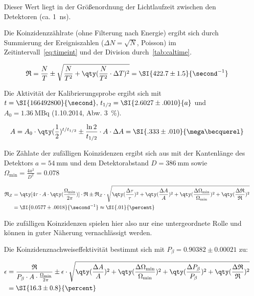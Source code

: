 \documentclass[slug=PET, room=Andreas-Schubert-Bau\,\ 424A, supervisor=Carsten\ Bittrich, coursedate=10.\ 01.\ 2020]{../../Lab_Report_LaTeX/lab_report}
\begin{document}
Dieser Wert liegt in der Gr\"o\ss{}enordnung der Lichtlaufzeit
zwischen den Detektoren (ca. \SI{1}{\nano\second}).

Die Koinzidenzz\"ahlrate (ohne Filterung nach Energie) ergibt sich
durch Summierung der Ereigniszahlen (\(\Delta N = \sqrt{N}\),
Poisson) im Zeitintervall~\eqref{eq:timeint} und der Division
durch~\eqref{tab:caltime}.

\begin{equation}
  \label{eq:ctrate}
  \mathfrak{R} = \frac{N}{T} \pm \sqrt{\frac{N}{T^2} +
    \qty(\frac{N}{T^2}\cdot \Delta T)^2} = \SI{422.7\pm 1.5}{\second^{-1}}
\end{equation}

Die Aktivität der  Kalibrierungsprobe ergibt sich mit
\(t=\SI{166492800}{\second},\, t_{1/2} = \SI{2.6027\pm .0010}{a}\) und \(A_0
= \SI{1.36}{\mega\becquerel}\) (1.10.2014, Abw. \SI{3}{\percent}).

\begin{equation}
  \label{eq:acttoday}
  A = A_0\cdot \qty(\frac{1}{2})^{t/t_{1/2}} \pm
  \frac{\ln{2}}{t_{1/2}}\cdot A\cdot\Delta A = \SI{.333\pm.010}{\mega\becquerel}
\end{equation}

Die Z\"ahlate der zuf\"alligen Koinzidenzen ergibt sich aus
mit der Kantenl\"ange des Detektors
\(a=\SI{54}{\milli\meter}\) und dem Detektorabstand
\(D=\SI{386}{\milli\meter}\) sowie
\(\Omega_{\min} = \frac{4a^2}{D^2} = 0.078\)

\begin{align}
  \label{eq:incidentalrate}
  \mathfrak{R}_Z &= \qty[4\tau\cdot A\cdot
  \qty(\frac{\Omega_{\min}}{2\pi})]\cdot \mathfrak{R} \pm \mathfrak{R}_Z\cdot
  \sqrt{\qty(\frac{\Delta\tau}{\tau})^2 + \qty(\frac{\Delta A}{A})^2 +
    \qty(\frac{\Delta\Omega_{\min}}{\Omega_{\min}})^2 +
                   \qty(\frac{\Delta\mathfrak{R}}{\mathfrak{R}})^2} \\
                 &= \SI{0.0577\pm .0018}{\second^{-1}} \approx \SI{.01}{\percent}
\end{align}

Die zuf\"alligen Koinzidenzen spielen hier also nur eine
untergeordnete Rolle und k\"onnen in guter N\"aherung vernachl\"assigt
werden.

Die Koinzidenznachweiseffektivit\"at bestimmt sich
mit \(P_\beta = 0.90382\pm 0.00021\) zu:

\begin{align}
  \epsilon & = \frac{\mathfrak{R}}{P_\beta\cdot A \cdot
  \frac{\Omega_{\min}}{2\pi}} \pm \epsilon\cdot\sqrt{\qty(\frac{\Delta A}{A})^2 +
  \qty(\frac{\Delta\Omega_{\min}}{\Omega_{\min}})^2 +
  \qty(\frac{\Delta P_\beta}{P_\beta})^2 +
             \qty(\frac{\Delta\mathfrak{R}}{\mathfrak{R}})^2} \\
  & = \SI{16.3\pm 0.8}{\percent}
\end{align}
\end{document}
